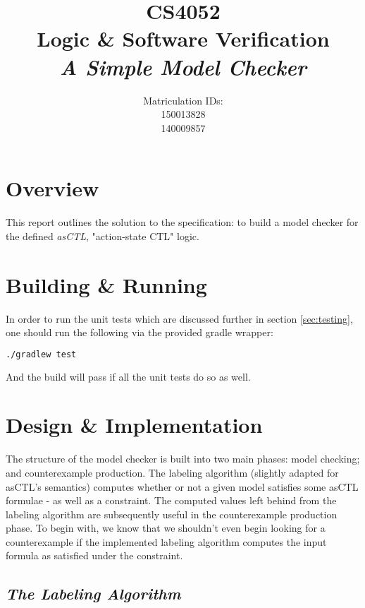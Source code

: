 \documentclass[]{article}
\title{CS4052\\Logic \& Software Verification\vspace*{1\baselineskip}\\\emph{A Simple Model Checker}}
\author{
Matriculation IDs:\vspace*{1\baselineskip}\\
150013828\vspace*{1\baselineskip}\\
140009857}
\begin{document}
\maketitle


\noindent

\section{Overview}
This report outlines the solution to the specification: to build a model checker for the defined \emph{asCTL}, "action-state CTL" logic.

\section{Building \& Running}\label{sec:build}

In order to run the unit tests which are discussed further in section \ref{sec:testing}, one should run the following via the provided gradle wrapper:
\begin{lstlisting}[frame=single, language=bash]
./gradlew test
\end{lstlisting}

And the build will pass if all the unit tests do so as well.

\section{Design \& Implementation}\label{sec:design}

The structure of the model checker is built into two main phases: model checking; and counterexample production. The labeling algorithm (slightly adapted for asCTL's semantics) computes whether or not a given model satisfies some asCTL formulae - as well as a constraint. The computed values left behind from the labeling algorithm are subsequently useful in the counterexample production phase. To begin with, we know that we shouldn't even begin looking for a counterexample if the implemented labeling algorithm computes the input formula as satisfied under the constraint.

\subsection{\emph{The Labeling Algorithm}}
\end{document}
